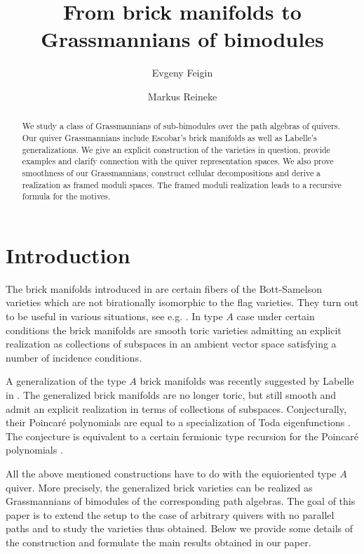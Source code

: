 \documentclass[12pt,a4paper]{amsart}
\title{From brick manifolds to Grassmannians of bimodules}
\author{Evgeny Feigin}
\author{Markus Reineke}
\numberwithin{equation}{section}
\theoremstyle{remark}
\begin{document}
\begin{abstract}
We study a class of Grassmannians of sub-bimodules over the path algebras 
of quivers. Our quiver Grassmannians include Escobar's brick manifolds as well 
as Labelle's generalizations. We give an explicit construction of the varieties
in question, provide examples and clarify connection with the quiver representation
spaces. We also prove smoothness of our Grassmannians, construct cellular
decompositions and derive a realization as framed  moduli spaces. The framed moduli  
realization leads to a recursive formula for the motives.
\end{abstract}

\maketitle


\section{Introduction}
The brick manifolds introduced in \cite{E16} are certain fibers of the Bott-Samelson
varieties which are not birationally isomorphic to the flag varieties. They turn out 
to be useful in various situations, see e.g. \cite{DSV19,CGGS21,Sp23}. In type $A$
case under certain conditions the brick manifolds are smooth toric varieties admitting
an explicit realization as collections of subspaces in an ambient vector space satisfying
a number of incidence conditions.

A generalization of the type $A$ brick manifolds was recently suggested by Labelle in 
\cite{L25}. The generalized brick manifolds are no longer toric, but still smooth and
admit an explicit realization in terms of collections of subspaces. Conjecturally, their
Poincar\'e polynomials are equal to a specialization of Toda eigenfunctions 
\cite{BF06,GL03}. The conjecture is equivalent to a certain fermionic type recursion 
for the Poincar\'e polynomials \cite{BF14,FFJMM09,L25}. 

All the above mentioned constructions have to do with the equioriented type $A$
quiver. More precisely, the generalized brick varieties can be realized as Grassmannians
of bimodules of the corresponding path algebras. 
The goal of this paper is to extend the setup to the case of arbitrary
quivers with no parallel paths and to study the varieties thus obtained. 
Below we provide some details
of the construction and formulate the main results obtained in our paper.
\end{document}
